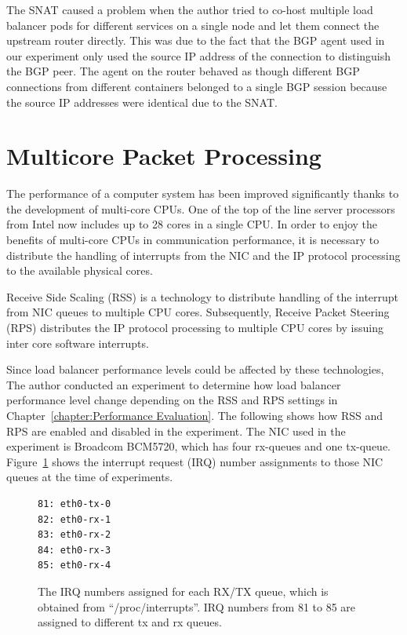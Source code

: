 The SNAT caused a problem when the author tried to co-host multiple load balancer pods for different services on a single node and let them connect the upstream router directly.
This was due to the fact that the BGP agent used in our experiment only used the source IP address of the connection to distinguish the BGP peer.
The agent on the router behaved as though different BGP connections from different containers belonged to a single BGP session because the source IP addresses were identical due to the SNAT.

\FloatBarrier

\section{Multicore Packet Processing}

The performance of a computer system has been improved significantly thanks to the development of multi-core CPUs.
One of the top of the line server processors from Intel now includes up to 28 cores in a single CPU.
In order to enjoy the benefits of multi-core CPUs in communication performance,
it is necessary to distribute the handling of interrupts from the NIC and the IP protocol processing to the available physical cores.

Receive Side Scaling (RSS) \cite{TomHerbert} is a technology 
to distribute handling of the interrupt from NIC queues to multiple CPU cores.
Subsequently, Receive Packet Steering (RPS) \cite{TomHerbert} distributes the IP protocol processing 
to multiple CPU cores by issuing inter core software interrupts.

Since load balancer performance levels could be affected by these technologies,
The author conducted an experiment to determine how load balancer performance level change depending on the RSS and RPS settings in Chapter~\ref{chapter:Performance Evaluation}.
The following shows how RSS and RPS are enabled and disabled in the experiment. 
The NIC used in the experiment is Broadcom BCM5720, which has four rx-queues and one tx-queue.
Figure~\ref{fig:rx-queue} shows the interrupt request (IRQ) number assignments to those NIC queues at the time of experiments.

\begin{figure}[h]
\centering
\begin{minipage}{0.3\columnwidth}
\begin{verbatim}
81: eth0-tx-0
82: eth0-rx-1
83: eth0-rx-2
84: eth0-rx-3
85: eth0-rx-4
\end{verbatim}
\end{minipage}

\par\bigskip
\centering
\begin{minipage}{0.9\columnwidth}
  \caption[The IRQ numbers assigned for each RX/TX queue]{
    The IRQ numbers assigned for each RX/TX queue, which is obtained from \enquote{/proc/interrupts}.
    IRQ numbers from 81 to 85 are assigned to different tx and rx queues.
  }
  \label{fig:rx-queue}
\end{minipage}

\end{figure}

